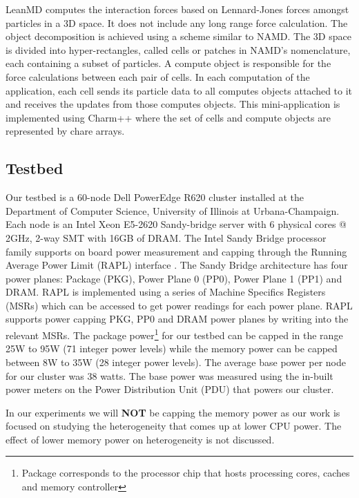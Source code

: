 \begin{description}
LeanMD computes the interaction forces based on Lennard-Jones forces amongst
particles in a 3D space. It does not include any long range force calculation.
The object decomposition is achieved using a scheme similar to NAMD. The 3D
space is divided into hyper-rectangles, called cells or patches in NAMD’s
nomenclature, each containing a subset of particles. A compute object is
responsible for the force calculations between each pair of cells. In each
computation of the application, each cell sends its particle data to all
computes objects attached to it and receives the updates from those computes
objects. This mini-application is implemented using Charm++ where the set of
cells and compute objects are represented by chare arrays.
\end{description}

\subsection {Testbed}
Our testbed is a 60-node Dell PowerEdge R620 cluster installed at the
Department of Computer Science, University of Illinois at Urbana-Champaign.
Each node is an Intel Xeon E5-2620 Sandy-bridge server with 6 physical cores @
2GHz, 2-way SMT with 16GB of DRAM.  The Intel Sandy Bridge processor family
supports on board power measurement and capping through the Running Average
Power Limit (RAPL) interface \cite{rapl}.  The Sandy Bridge architecture has
four power planes: Package (PKG), Power Plane 0 (PP0), Power Plane 1 (PP1) and
DRAM. RAPL is implemented using a series of Machine Specifics Registers (MSRs)
  which can be accessed to get power readings for each power plane. RAPL
  supports power capping PKG, PP0 and DRAM power planes by writing into the
relevant MSRs. The package power\footnote{Package corresponds to the processor
  chip that hosts processing cores, caches and memory controller} for our
testbed can be capped in the range 25W to 95W (71 integer power levels) while
the memory power can be capped between 8W to 35W (28 integer power levels). The
average base power per node for our cluster was 38 watts.  The base power was
measured using the in-built power meters on the Power Distribution Unit (PDU)
  that powers our cluster.  

In our experiments we will \textbf{NOT} be capping the
memory power as our work is focused on studying the heterogeneity that comes up at
lower CPU power. The effect of lower memory power on heterogeneity is not
discussed.

